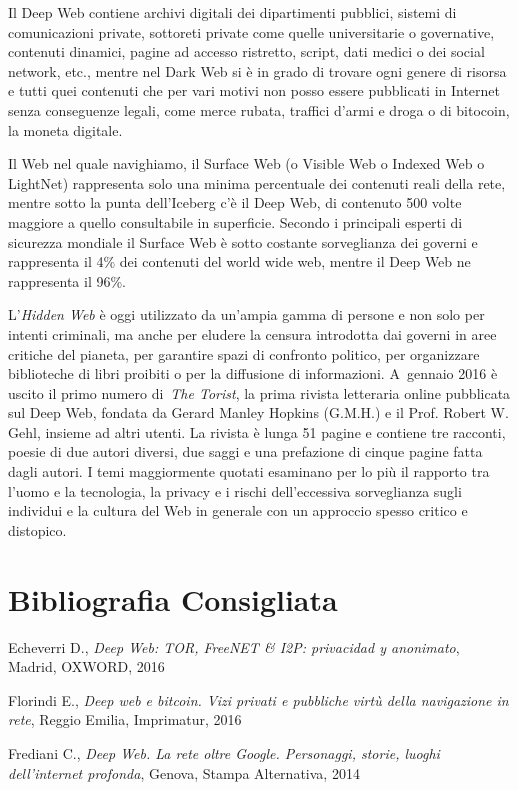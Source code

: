 {Il Deep Web contiene archivi digitali dei dipartimenti pubblici, sistemi
di comunicazioni private, sottoreti private come quelle universitarie o
governative, contenuti dinamici, pagine ad accesso ristretto, script,
dati medici o dei social network, etc., mentre nel Dark Web si è in
grado di trovare ogni genere di risorsa e tutti quei contenuti che per
vari motivi non posso essere pubblicati in Internet senza conseguenze
legali, come merce rubata, traffici d'armi e droga o di bitocoin, la
moneta digitale.

Il Web nel quale navighiamo, il Surface Web (o Visible Web o Indexed Web
o LightNet) rappresenta solo una minima percentuale dei contenuti reali
della rete, mentre sotto la punta dell'Iceberg c'è il Deep Web, di
contenuto 500 volte maggiore a quello consultabile in superficie.
Secondo i principali esperti di sicurezza mondiale il Surface Web è
sotto costante sorveglianza dei governi e rappresenta il 4\% dei
contenuti del world wide web, mentre il Deep Web ne rappresenta il 96\%.

L'\emph{Hidden Web} è oggi utilizzato da un'ampia gamma di persone e non
solo per intenti criminali, ma anche per eludere la censura introdotta
dai governi in aree critiche del pianeta, per garantire spazi di
confronto politico, per organizzare biblioteche di libri proibiti o per
la diffusione di informazioni. A~gennaio 2016 è uscito il primo numero
di~\emph{The Torist}, la prima rivista letteraria online pubblicata sul
Deep Web, fondata da Gerard Manley Hopkins (G.M.H.) e il Prof. Robert W.
Gehl, insieme ad altri utenti. La rivista è lunga 51 pagine e contiene
tre racconti, poesie di due autori diversi, due saggi e una prefazione
di cinque pagine fatta dagli autori. I temi maggiormente quotati
esaminano per lo più il rapporto tra l'uomo e la tecnologia, la privacy
e i rischi dell'eccessiva sorveglianza sugli individui e la cultura del
Web in generale con un approccio spesso critico e distopico.

\section*{Bibliografia Consigliata}
{\parindent0pt 
Echeverri D., \emph{Deep Web: TOR, FreeNET \& I2P: privacidad y
anonimato}, Madrid, OXWORD, 2016

Florindi E., \emph{Deep web e bitcoin. Vizi privati e pubbliche virtù
della navigazione in rete}, Reggio Emilia, Imprimatur, 2016

Frediani C., \emph{Deep Web. La rete oltre Google. Personaggi, storie,
luoghi dell'internet profonda}, Genova, Stampa Alternativa, 2014

}}
